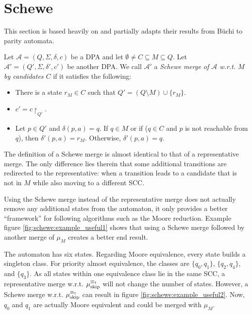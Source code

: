 
\section{Schewe}
\label{sect:schewe}

This section is based heavily on \cite{Schewe2010} and partially adapts their results from B\"uchi to parity automata.

\begin{defn}
		Let $\mathcal{A} = (Q, \Sigma, \delta, c)$ be a DPA and let $\emptyset \neq C \subseteq M \subseteq Q$. Let $\mathcal{A}' = (Q', \Sigma, \delta', c')$ be another DPA. We call $\mathcal{A}'$ a \emph{Schewe merge of $\mathcal{A}$ w.r.t. $M$ by candidates $C$} if it satisfies the following:
	\begin{itemize}
		\item There is a state $r_M \in C$ such that $Q' = (Q \setminus M) \cup \{r_M\}$.
		\item $c' = c\upharpoonright_{Q'}$.
		\item Let $p \in Q'$ and $\delta(p, a) = q$. If $q \in M$ or if ($q \in C$ and $p$ is not reachable from $q$), then $\delta'(p, a) = r_M$. Otherwise, $\delta'(p, a) = q$. 
	\end{itemize}
\end{defn}

The definition of a Schewe merge is almost identical to that of a representative merge. The only difference lies therein that some additional transitions are redirected to the representative: when a transition leads to a candidate that is not in $M$ while also moving to a different SCC.

Using the Schewe merge instead of the representative merge does not actually remove any additional states from the automaton, it only provides a better \enquote{framework} for following algorithms such as the Moore reduction. Example figure \ref{fig:schewe:example_useful1} shows that using a Schewe merge followed by another merge of $\mu_M$ creates a better end result.

The automaton has six states. Regarding Moore equivalence, every state builds a singleton class. For priority almost equivalence, the classes are $\{q_0, q_1\}$, $\{q_2, q_4\}$, and $\{q_3\}$. As all states within one equivalence class lie in the same SCC, a representative merge w.r.t. $\mu_\text{skip}^{\equiv_\text{\Ankh}}$ will not change the number of states. However, a Schewe merge w.r.t. $\mu_\text{skip}^{\equiv_\text{\Ankh}}$ can result in figure \ref{fig:schewe:example_useful2}. Now, $q_0$ and $q_1$ are actually Moore equivalent and could be merged with $\mu_M$.

